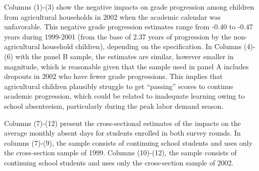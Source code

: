 \documentclass[12pt,letterpaper]{article}
\newcommand{\0}{\ensuremath{\mbox{\boldmath $0$}}}
\begin{document}
Columns (1)-(3) show the negative impacts on grade progression among children from agricultural households in 2002 when the academic calendar was unfavorable. This negative grade progression estimates range from -0.40 to -0.47 years during 1999-2001 (from the base of 2.37 years of progression by the non-agricultural household children), depending on the specification. In Columns (4)-(6) with the panel B sample, the estimates are similar, however smaller in magnitude, which is reasonable given that the sample used in panel A includes dropouts in 2002 who have fewer grade progressions. This implies that agricultural children plausibly struggle to get ``passing'' scores to continue academic progression, which could be related to inadequate learning owing to school absenteeism, particularly during the peak labor demand season. 

Columns (7)-(12) present the cross-sectional estimates of the impacts on the average monthly absent days for students enrolled in both survey rounds. In columns (7)-(9), the sample consists of continuing school students and uses only the cross-section sample of 1999. Columns (10)-(12), the sample consists of continuing school students and uses only the cross-section sample of 2002.
\end{document}
